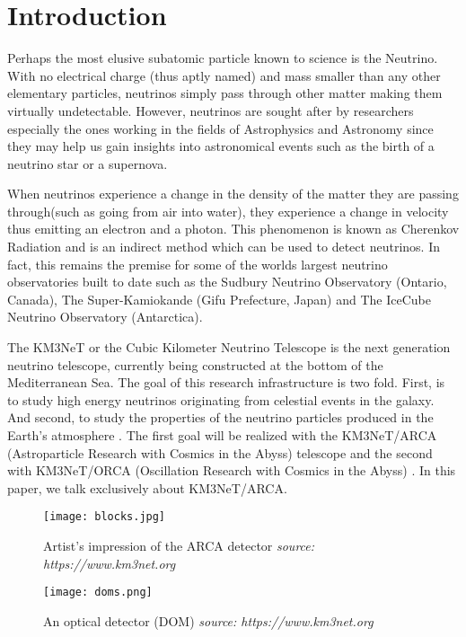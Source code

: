 
\chapter{Introduction}
\label{cha:intro}

Perhaps the most elusive subatomic particle known to science is the
Neutrino. With no electrical charge (thus aptly named) and mass
smaller than any other elementary particles, neutrinos simply pass
through other matter making them virtually undetectable. However,
neutrinos are sought after by researchers especially the ones working
in the fields of Astrophysics and Astronomy since they may help us
gain insights into astronomical events such as the birth of a neutrino
star or a supernova.

When neutrinos experience a change in the density of the matter they
are passing through(such as going from air into water), they
experience a change in velocity thus emitting an electron and a
photon. This phenomenon is known as Cherenkov Radiation
\cite{margiotta2014km3net} and is an indirect method which can be used
to detect neutrinos. In fact, this remains the premise for some of the
worlds largest neutrino observatories built to date such as the
Sudbury Neutrino Observatory (Ontario, Canada), The Super-Kamiokande
(Gifu Prefecture, Japan) and The IceCube Neutrino Observatory
(Antarctica).

The KM3NeT or the Cubic Kilometer Neutrino Telescope is the next
generation neutrino telescope, currently being constructed at the
bottom of the Mediterranean Sea. The goal of this research
infrastructure is two fold. First, is to study high energy neutrinos
originating from celestial events in the galaxy. And second, to study
the properties of the neutrino particles produced in the Earth's
atmosphere \cite{adrian2016letter}. The first goal will be realized
with the KM3NeT/ARCA (Astroparticle Research with Cosmics in the
Abyss) telescope and the second with KM3NeT/ORCA (Oscillation Research
with Cosmics in the Abyss) \cite{adrian2016letter}. In this paper, we
talk exclusively about KM3NeT/ARCA.

\begin{figure}[htb]
  \centering
  \begin{minipage}{0.74\textwidth}
    \texttt{[image: blocks.jpg]}
    \caption{Artist's impression of the ARCA detector \textit{source: https://www.km3net.org}}%
    \label{fig:blocks}    
  \end{minipage}
  \begin{minipage}{0.24\textwidth}
    \texttt{[image: doms.png]}
    \caption{An optical detector (DOM) \textit{source: https://www.km3net.org}}%
    \label{fig:doms}    
  \end{minipage}
\end{figure}

